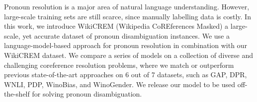 Pronoun resolution is a major area of natural language understanding. However, large-scale training sets are still scarce, since manually labelling data is costly.
    In this work, we introduce WikiCREM (Wikipedia CoREferences Masked) a large-scale, yet accurate dataset of pronoun disambiguation instances. 
    We use a language-model-based approach for pronoun resolution in combination with our WikiCREM dataset.
    We compare a series of models on a collection of diverse and challenging coreference resolution problems, where we match or outperform previous state-of-the-art approaches on 6 out of 7 datasets, such as GAP, DPR, WNLI, PDP, WinoBias, and WinoGender. We release our model to be used off-the-shelf for solving pronoun disambiguation.